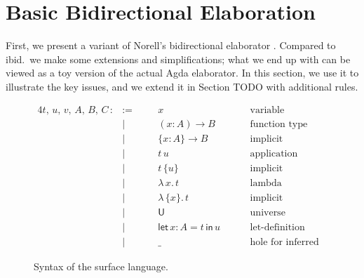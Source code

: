 \documentclass[acmsmall,review,anonymous,prologue,dvipsnames]{acmart}\settopmatter{printfolios=true,printccs=false,printacmref=false}
\newcommand{\slet}{\boldsymbol{\mathsf{let}}}
\renewcommand{\sin}{\boldsymbol{\mathsf{in}}}
\renewcommand{\U}{\mathsf{U}}
\theoremstyle{remark}
\begin{document}
\section{Basic Bidirectional Elaboration}
\label{sec:basic_bidirectional_elaboration}

First, we present a variant of Norell's bidirectional elaborator
\cite[Chapter~3]{norell07thesis}. Compared to ibid.\ we make some extensions and
simplifications; what we end up with can be viewed as a toy version of the
actual Agda elaborator. In this section, we use it to illustrate the key issues,
and we extend it in Section TODO with additional rules.
\begin{figure}[h]
\begin{alignat*}{4}
  t,\,u,\,v,\,A,\,B,\,C\, :&:=\quad  && x\hspace{8em}              & \text{variable}                 &  \\
                           & |       && (x : A)\to B               & \text{function type}            &  \\
                           & |       && \{x : A\}\to B             & \text{implicit function type}   &  \\
                           & |       && t\,u                       & \text{application}              &  \\
                           & |       && t\,\{u\}                   & \text{implicit application}     &  \\
                           & |       && \lambda\,x.\, t            & \text{lambda abstraction}       &  \\
                           & |       && \lambda\,\{x\}.\,t         & \text{implicit abstraction}     &  \\
                           & |       && \U                         & \text{universe}                 &  \\
                           & |       && \slet\,x : A = t\,\sin\, u & \text{let-definition}           &  \\
                           & |       && \_                         & \text{hole for inferred term}   &
\end{alignat*}
\caption{Syntax of the surface language.}
\label{fig:surface}
\end{figure}
\end{document}
